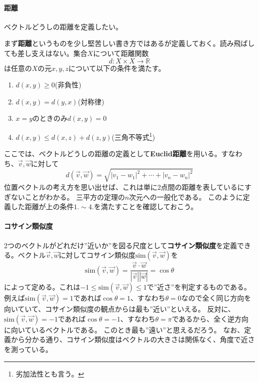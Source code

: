 \documentclass[10pt]{jsarticle}
\newcommand{\vc}[1]{\overrightarrow{#1}}%
\numberwithin{equation}{section}%
\begin{document}
\paragraph{距離}ベクトルどうしの距離を定義したい。


まず{\bf 距離}というものを少し堅苦しい書き方ではあるが定義しておく。読み飛ばしても差し支えはない。集合$X$について距離関数
\begin{equation}
  d:X\times X \to \mathbb{R}
\end{equation}
は任意の$X$の元$x,y,z$について以下の条件を満たす。
\begin{enumerate}
  \item $d(x,y)\geq 0$(非負性)
  \item $d(x,y)=d(y,x)$(対称律)
  \item $x=y$のときのみ$d(x,y)=0$
  \item $d(x,y)\leq d(x,z)+d(z,y)$(三角不等式\footnote{劣加法性とも言う。})
\end{enumerate}
ここでは、ベクトルどうしの距離の定義として{\bf Euclid距離}を用いる。すなわち、$\vc{v},\vc{w}$に対して
\begin{equation}
  \label{kyori}d(\vc{v},\vc{w})=\sqrt{|v_{1}-w_{1}|^{2}+\cdots +|v_{n}-w_{n}|^{2}}
\end{equation}
位置ベクトルの考え方を思い出せば、これは単に2点間の距離を表しているにすぎないことがわかる。
三平方の定理の$n$次元への一般化である。
このように定義した距離が上の条件$1.\sim 4.$を満たすことを確認しておこう。
\paragraph{コサイン類似度}
2つのベクトルがどれだけ''近いか''を図る尺度として{\bf コサイン類似度}を定義できる。ベクトル$\vc{v},\vc{w}$に対してコサイン類似度$\mathrm{sim}(\vc{v},\vc{w})$を
\begin{equation}
\label{cossim} \mathrm{sim}(\vc{v},\vc{w})=\frac{\vc{v}\cdot \vc{w}}{|\vc{v}||\vc{w}|}=\cos{\theta}
\end{equation}
によって定める。これは$-1\leq \mathrm{sim}(\vc{v},\vc{w})\leq 1$で''近さ''を判定するものである。例えば$\mathrm{sim}(\vc{v},\vc{w})=1$であれば$\cos{\theta}=1$、すなわち$\theta=0$なので全く同じ方向を向いていて、コサイン類似度の観点からは最も''近い''といえる。
反対に、$\mathrm{sim}(\vc{v},\vc{w})=-1$であれば$\cos{\theta}=-1$、すなわち$\theta=\pi$であるから、全く逆方向に向いているベクトルである。
このとき最も''遠い''と思えるだろう。
なお、定義から分かる通り、コサイン類似度はベクトルの大きさは関係なく、角度で近さを測っている。
\end{document}
